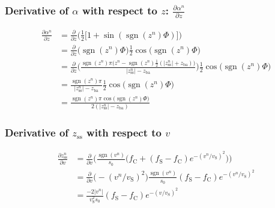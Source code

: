 \documentclass{article}
\DeclareMathOperator{\sgn}{sgn}
\begin{document}
\subsubsection*{Derivative of $\alpha$ with respect to $z$: $\frac{\partial \alpha^n}{\partial z}$}
\begin{equation}
    \begin{aligned}
    \frac{\partial \alpha^n}{\partial z} &= \frac{\partial}{\partial z} \Bigg(\frac{1}{2}\big[1+\sin(\sgn(z^n)\Phi)\big]\Bigg)\\
    &= \frac{\partial}{\partial z}\Big(\sgn(z^n)\Phi\Big)\frac{1}{2}\cos\big(\sgn(z^n)\Phi\big)\\
    &= \frac{\partial}{\partial z}\Bigg(\frac{\sgn(z^n)\pi\big(z^n-\sgn(z^n)\frac{1}{2}(|z_\text{ss}^n|+z_\text{ba})\big)}{|z_\text{ss}^n|-z_\text{ba}}\Bigg)\frac{1}{2}\cos\big(\sgn(z^n)\Phi\big)\\
    &= \frac{\sgn(z^n)\pi}{|z_\text{ss}^n|-z_\text{ba}}\frac{1}{2}\cos\big(\sgn(z^n)\Phi\big)\\
    &= \frac{\sgn(z^n)\pi\cos\big(\sgn(z^n)\Phi\big)}{2(|z_\text{ss}^n|-z_\text{ba})}
    \end{aligned}
\end{equation}
\subsubsection*{Derivative of $z_\text{ss}$ with respect to $v$}
\begin{equation}
\begin{aligned}
    \frac{\partial z_\text{ss}^n}{\partial v} &= \frac{\partial}{\partial v} \Bigg(\frac{\sgn(v^n)}{s_0}\Big(f_\text{C}+(f_\text{S}-f_\text{C})e^{-(v^n/v_\text{S})^2}\Big)\Bigg)\\
    &= \frac{\partial}{\partial v}\big(-(v^n/v_\text{S})^2\big)\frac{\sgn(v^n)}{s_0}(f_\text{S}-f_\text{C})e^{-(v^n/v_\text{S})^2}\\
    &= \frac{-2|v^n|}{v_\text{S}^2s_0}(f_\text{S}-f_\text{C})e^{-(v/v_\text{S})^2}
    \end{aligned}
\end{equation}
\end{document}
